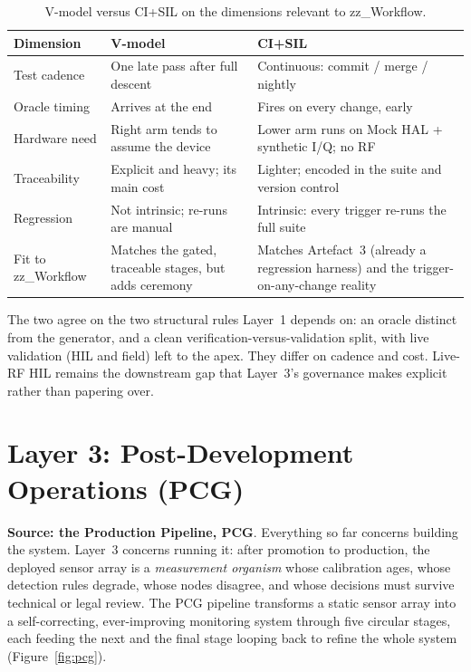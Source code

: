 \documentclass[11pt,a4paper]{article}
\begin{document}
\begin{table}[htbp]
\centering
\caption{V-model versus CI+SIL on the dimensions relevant to zz\_Workflow.}
\label{tab:vsil}
\small
\begin{tabular}{@{}lp{5.1cm}p{6.6cm}@{}}
\toprule
\textbf{Dimension} & \textbf{V-model} & \textbf{CI+SIL} \\
\midrule
Test cadence & One late pass after full descent & Continuous: commit / merge / nightly \\
Oracle timing & Arrives at the end & Fires on every change, early \\
Hardware need & Right arm tends to assume the device & Lower arm runs on Mock HAL + synthetic I/Q; no RF \\
Traceability & Explicit and heavy; its main cost & Lighter; encoded in the suite and version control \\
Regression & Not intrinsic; re-runs are manual & Intrinsic: every trigger re-runs the full suite \\
Fit to zz\_Workflow & Matches the gated, traceable stages, but adds ceremony & Matches Artefact~3 (already a regression harness) and the trigger-on-any-change reality \\
\bottomrule
\end{tabular}
\end{table}

The two agree on the two structural rules Layer~1 depends on: an oracle distinct from the
generator, and a clean verification-versus-validation split, with live validation (HIL and field)
left to the apex. They differ on cadence and cost. Live-RF HIL remains the downstream gap that
Layer~3's governance makes explicit rather than papering over.

\section{Layer 3: Post-Development Operations (PCG)}
\label{sec:layer3}

\textbf{Source: the Production Pipeline, PCG}. Everything so far concerns building the system.
Layer~3 concerns running it: after promotion to production, the deployed sensor array is a
\emph{measurement organism} whose calibration ages, whose detection rules degrade, whose nodes
disagree, and whose decisions must survive technical or legal review. The PCG pipeline
transforms a static sensor array into a self-correcting, ever-improving monitoring system through
five circular stages, each feeding the next and the final stage looping back to refine the whole
system (Figure~\ref{fig:pcg}).
\end{document}
